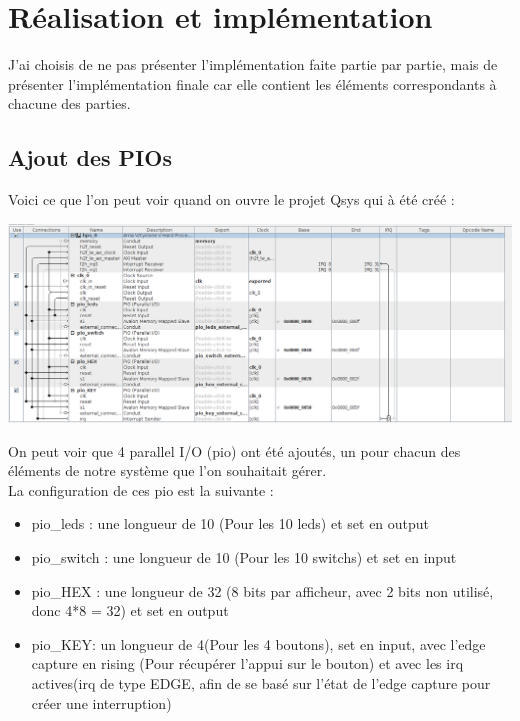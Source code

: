 \section{Réalisation et implémentation}

J'ai choisis de ne pas présenter l'implémentation faite partie par partie, mais de présenter l'implémentation finale car elle contient les éléments correspondants à chacune des parties. 

\subsection{Ajout des PIOs}

Voici ce que l'on peut voir quand on ouvre le projet Qsys qui à été créé : 

\includegraphics[scale=0.35]{./images/pios.png}

On peut voir que 4 parallel I/O (pio) ont été ajoutés, un pour chacun des éléments de notre système que l'on souhaitait gérer.\\

La configuration de ces pio est la suivante : \\

\begin{itemize}
	\item pio\_leds : une longueur de 10 (Pour les 10 leds) et set en output
	\item pio\_switch : une longueur de 10 (Pour les 10 switchs) et set en input
	\item pio\_HEX : une longueur de 32 (8 bits par afficheur, avec 2 bits non utilisé, donc 4*8 = 32) et set en output
	\item pio\_KEY: un longueur de 4(Pour les 4 boutons), set en input, avec l'edge capture en rising (Pour récupérer l'appui sur le bouton) et avec les irq actives(irq de type EDGE, afin de se basé sur l'état de l'edge capture pour créer une interruption)\\
\end{itemize}

